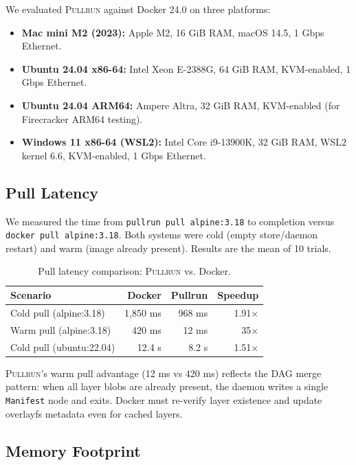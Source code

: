 \documentclass[11pt,a4paper]{article}
\newcommand{\pullrun}{\textsc{Pullrun}}
\begin{document}
We evaluated \pullrun{} against Docker 24.0 on three platforms:

\begin{itemize}[leftmargin=*]
    \item \textbf{Mac mini M2 (2023):} Apple M2, 16 GiB RAM, macOS 14.5, 1 Gbps Ethernet.
    \item \textbf{Ubuntu 24.04 x86-64:} Intel Xeon E-2388G, 64 GiB RAM, KVM-enabled, 1 Gbps Ethernet.
    \item \textbf{Ubuntu 24.04 ARM64:} Ampere Altra, 32 GiB RAM, KVM-enabled (for Firecracker ARM64 testing).
    \item \textbf{Windows 11 x86-64 (WSL2):} Intel Core i9-13900K, 32 GiB RAM, WSL2 kernel 6.6, KVM-enabled, 1 Gbps Ethernet.
\end{itemize}

\subsection{Pull Latency}

We measured the time from \texttt{pullrun pull alpine:3.18} to completion versus \texttt{docker pull alpine:3.18}. Both systems were cold (empty store/daemon restart) and warm (image already present). Results are the mean of 10 trials.

\begin{table}[htbp]
    \centering
    \caption{Pull latency comparison: \pullrun{} vs. Docker.}
    \label{tab:pull-latency}
    \begin{tabular}{@{}lrrr@{}}
        \toprule
        \textbf{Scenario} & \textbf{Docker} & \textbf{Pullrun} & \textbf{Speedup} \\
        \midrule
        Cold pull (alpine:3.18) & 1,850 ms & 968 ms & 1.91$\times$ \\
        Warm pull (alpine:3.18) & 420 ms & 12 ms & 35$\times$ \\
        Cold pull (ubuntu:22.04) & 12.4 s & 8.2 s & 1.51$\times$ \\
        \bottomrule
    \end{tabular}
\end{table}

\pullrun{}'s warm pull advantage (12 ms vs 420 ms) reflects the DAG merge pattern: when all layer blobs are already present, the daemon writes a single \texttt{Manifest} node and exits. Docker must re-verify layer existence and update overlayfs metadata even for cached layers.

\subsection{Memory Footprint}
\end{document}
